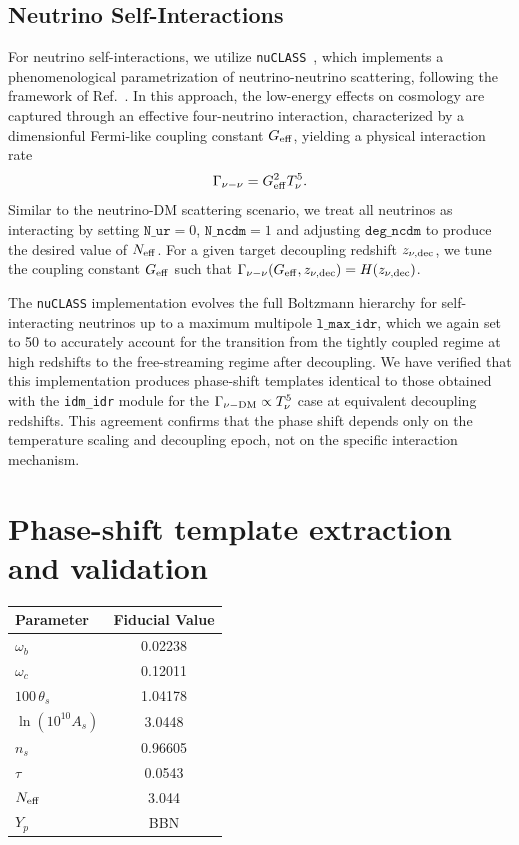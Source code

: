 \begin{subappendices}
\subsection{Neutrino Self-Interactions}

\noindent For neutrino self-interactions, we utilize \texttt{nuCLASS}~\cite{Libanore:2025ack}, which implements a phenomenological parametrization of neutrino-neutrino scattering, following the framework of Ref.~\cite{Kreisch:2019yzn}. In this approach, the low-energy effects on cosmology are captured through an effective four-neutrino interaction, characterized by a dimensionful Fermi-like coupling constant $G_{\rm eff}$, yielding a physical interaction rate
\begin{equation}
    \Gamma_{\nu-\nu} = G_{\rm eff}^2 T_\nu^5 .\label{eq:ch13-A2}
\end{equation}
Similar to the neutrino-DM scattering scenario, we treat all neutrinos as interacting by setting $\texttt{N\_ur}=0$, $\texttt{N\_ncdm}=1$ and adjusting $\texttt{deg\_ncdm}$ to produce the desired value of $N_\mathrm{eff}$. For a given target decoupling redshift $z_{\nu,\rm dec}$, we tune the coupling constant $G_{\rm eff}$ such that $\Gamma_{\nu-\nu}(G_{\rm eff},z_{\nu,\rm dec}) = H(z_{\nu,\rm dec})$.

The \texttt{nuCLASS} implementation evolves the full Boltzmann hierarchy for self-interacting neutrinos up to a maximum multipole $\texttt{l\_max\_idr}$, which we again set to 50 to accurately account for the transition from the tightly coupled regime at high redshifts to the free-streaming regime after decoupling. We have verified that this implementation produces phase-shift templates identical to those obtained with the \texttt{idm\_idr} module for the $\Gamma_{\nu-\rm DM} \propto T_\nu^5$ case at equivalent decoupling redshifts. This agreement confirms that the phase shift depends only on the temperature scaling and decoupling epoch, not on the specific interaction mechanism.


\section{Phase-shift template extraction and validation}\label{sec:ch13-A2}

\begin{table}
	\centering
	\begin{tabular}{lc}
			\toprule
		Parameter 				& Fiducial Value															\\
			\midrule[0.065em]
		$\omega_b$ 				& 0.02238 				 		\\
		$\omega_c$				& 0.12011					\\
		$100\,\theta_s$ 		& 1.04178 						\\
		$\ln(10^{10}A_s)$		& 3.0448							\\
		$n_s$					& 0.96605 													\\
		$\tau$ 					& 0.0543 									\\
		$N_{\rm eff}$					& 3.044 							\\
		$Y_p$					& BBN\\


\end{tabular}
\end{table}
\end{subappendices}
